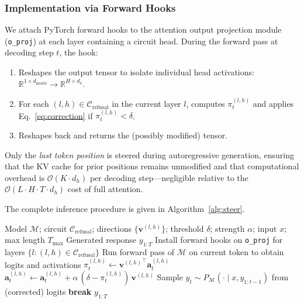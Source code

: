 \documentclass[11pt]{article}
\begin{document}
\subsubsection{Implementation via Forward Hooks}
\label{subsubsec:hooks}

We attach PyTorch forward hooks to the attention output projection module (\texttt{o\_proj}) at each layer containing a circuit head. During the forward pass at decoding step $t$, the hook:
\begin{enumerate}[leftmargin=*,itemsep=1pt]
\item Reshapes the output tensor to isolate individual head activations: $\mathbb{R}^{1\times d_{\mathrm{model}}} \to \mathbb{R}^{H\times d_h}$.
\item For each $(l,h)\in\mathcal{C}_{\mathrm{refusal}}$ in the current layer $l$, computes $\pi_t^{(l,h)}$ and applies Eq.~\ref{eq:correction} if $\pi_t^{(l,h)}<\delta$.
\item Reshapes back and returns the (possibly modified) tensor.
\end{enumerate}
Only the \emph{last token position} is steered during autoregressive generation, ensuring that the KV cache for prior positions remains unmodified and that computational overhead is $\mathcal{O}(K\cdot d_h)$ per decoding step---negligible relative to the $\mathcal{O}(L\cdot H\cdot T\cdot d_h)$ cost of full attention.

The complete inference procedure is given in Algorithm~\ref{alg:steer}.

\begin{algorithm}[t]
\caption{Phase 2: Soft Steering at Inference}
\label{alg:steer}
\begin{algorithmic}[1]
\Require Model $\mathcal{M}$; circuit $\mathcal{C}_{\mathrm{refusal}}$; directions $\{\mathbf{v}^{(l,h)}\}$; threshold $\delta$; strength $\alpha$; input $x$; max length $T_{\max}$
\Ensure Generated response $y_{1:T}$
\Statex
\State Install forward hooks on \texttt{o\_proj} for layers $\{l:(l,h)\in\mathcal{C}_{\mathrm{refusal}}\}$
    \State Run forward pass of $\mathcal{M}$ on current token to obtain logits and activations
     
        \State $\pi_t^{(l,h)} \gets {\mathbf{v}^{(l,h)}}^\top\!\mathbf{a}_t^{(l,h)}$
            \State $\mathbf{a}_t^{(l,h)} \gets \mathbf{a}_t^{(l,h)} + \alpha\,(\delta - \pi_t^{(l,h)})\,\mathbf{v}^{(l,h)}$ 
        \EndIf
    \EndFor
    \State Sample $y_t\sim P_{\mathcal{M}}(\cdot\mid x, y_{1:t-1})$ from (corrected) logits
     \textbf{break} \EndIf
\EndFor
\State \Return $y_{1:T}$
\end{algorithmic}
\end{algorithm}
\end{document}
